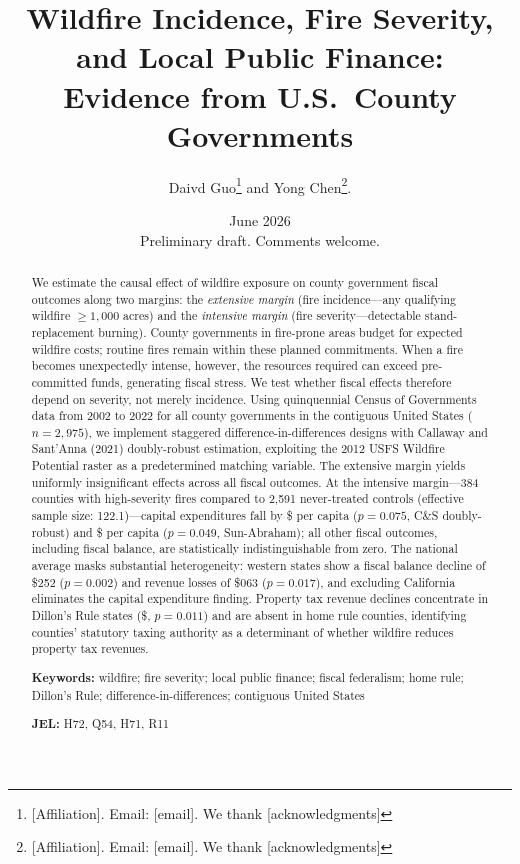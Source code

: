 \documentclass[12pt]{article}
\title{\large\textbf{Wildfire Incidence, Fire Severity, and Local Public Finance: \\
Evidence from U.S.\ County Governments}}
\author{
  Daivd Guo\thanks{[Affiliation]. Email: [email]. We thank [acknowledgments]} and Yong Chen\thanks{[Affiliation]. Email: [email]. We thank [acknowledgments]}.
}
\date{June 2026 \\ \smallskip \small Preliminary draft. Comments welcome.}
\begin{document}
\maketitle

\begin{abstract}
\noindent We estimate the causal effect of wildfire exposure on county government fiscal
outcomes along two margins: the \textit{extensive margin} (fire incidence---any
qualifying wildfire $\geq\!1{,}000$ acres) and the \textit{intensive margin} (fire
severity---detectable stand-replacement burning). County governments in fire-prone
areas budget for expected wildfire costs; routine fires remain within these planned
commitments. When a fire becomes unexpectedly intense, however, the resources
required can exceed pre-committed funds, generating fiscal stress. We test whether
fiscal effects therefore depend on severity, not merely incidence. Using quinquennial
Census of Governments data from 2002 to 2022 for all county governments in the
contiguous United States ($n = 2{,}975$), we implement staggered
difference-in-differences designs with Callaway and Sant'Anna (2021) doubly-robust
estimation, exploiting the 2012 USFS Wildfire Potential raster as a predetermined
matching variable. The extensive margin yields uniformly insignificant effects across
all fiscal outcomes. At the intensive margin---384 counties with high-severity fires
compared to 2,591 never-treated controls (effective sample size: 122.1)---capital
expenditures fall by \$ per capita ($p = 0.075$, C\&S doubly-robust) and
\$ per capita ($p = 0.049$, Sun-Abraham); all other fiscal outcomes, including
fiscal balance, are statistically indistinguishable from zero. The national average
masks substantial heterogeneity: western states show a fiscal balance decline of
\$252 ($p = 0.002$) and revenue losses of \$063 ($p = 0.017$),
and excluding California eliminates the capital expenditure finding. Property tax
revenue declines concentrate in Dillon's Rule states (\$, $p = 0.011$) and
are absent in home rule counties, identifying counties' statutory taxing authority
as a determinant of whether wildfire reduces property tax revenues.
\medskip

\noindent\textbf{Keywords:} wildfire; fire severity; local public finance; fiscal federalism;
home rule; Dillon's Rule; difference-in-differences; contiguous United States

\noindent\textbf{JEL:} H72, Q54, H71, R11
\end{abstract}
\end{document}
